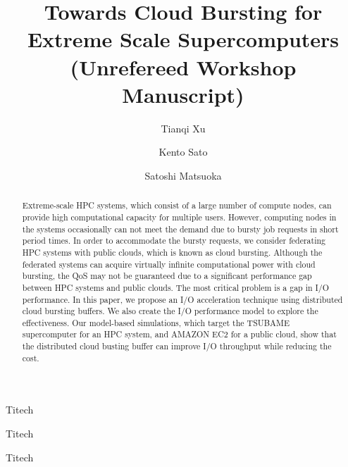 \documentclass[techreq,english]{ipsj}
\begin{document}
\title{Towards Cloud Bursting for Extreme Scale Supercomputers\\
   (Unrefereed Workshop Manuscript)}

\author{Tianqi Xu}{Titech}
\author{Kento Sato}{Titech}
\author{Satoshi Matsuoka}{Titech}

\begin{abstract}


Extreme-scale HPC systems, which consist of a large number of compute nodes, can provide high computational capacity for multiple users. However, computing nodes in the systems occasionally can not meet the demand due to bursty job requests in short period times. In order to accommodate the bursty requests, we consider federating HPC systems with public clouds, which is known as cloud bursting. Although the federated systems can acquire virtually infinite computational power with cloud bursting, the QoS may not be guaranteed due to a significant performance gap between HPC systems and public clouds. The most critical problem is a gap in I/O performance. In this paper, we propose an I/O acceleration technique using distributed cloud bursting buffers. We also create the I/O performance model to explore the effectiveness. Our model-based simulations, which target the TSUBAME supercomputer for an HPC system, and AMAZON EC2 for a public cloud, show that the distributed cloud busting buffer can improve I/O throughput while reducing the cost.

\end{abstract}
\end{document}
